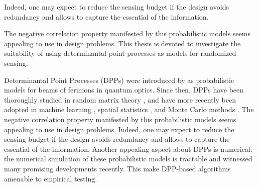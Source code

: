\documentclass[twoside,11pt]{book}
\numberwithin{theorem}{chapter}
\numberwithin{definition}{chapter}
\numberwithin{proposition}{chapter}
\numberwithin{corollary}{chapter}
\numberwithin{example}{chapter}
\numberwithin{lemma}{chapter}
\numberwithin{assumption}{chapter}
\begin{document}

Indeed, one may expect to reduce the sensing budget if the design avoids redundancy and allows to capture the essential of the information. 

The negative correlation property manifested by this probabilistic models seems appealing to use in design problems.
This thesis is devoted to investigate the suitability of using determinantal point processes as models for randomized sensing.














 Determinantal Point Processes (DPPs) were introduced by \cite{Mac75} as probabilistic models for beams of fermions in quantum optics. Since then, DPPs have been thoroughly studied in random matrix theory \citep{Joh05}, and have more recently been adopted in machine learning \citep*{KuTa12}, spatial statistics \citep*{LaMoRu15}, and Monte Carlo methods \citep{BaHa16}.
The negative correlation property manifested by this probabilistic models seems appealing to use in design problems. Indeed, one may expect to reduce the sensing budget if the design avoids redundancy and allows to capture the essential of the information. 
Another appealing aspect about DPPs is numerical: the numerical simulation of these probabilistic models is tractable and witnessed many promising developments recently.
This make DPP-based algorithms amenable to empirical testing.
 
\end{document}
